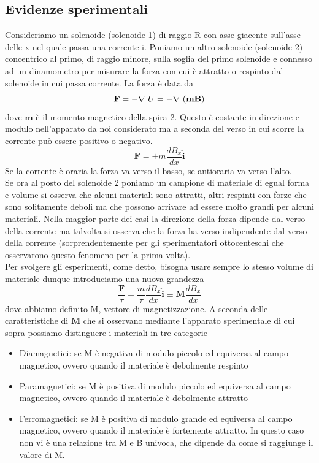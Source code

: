 \documentclass[
10pt, %
a4paper, %
oneside, %
headinclude,footinclude, %
BCOR5mm, %
]{scrartcl}
\begin{document}
\subsection{Evidenze sperimentali}
Consideriamo un solenoide (solenoide 1) di raggio R con asse giacente sull'asse delle x nel quale passa una corrente i. Poniamo un altro solenoide (solenoide 2) concentrico al primo, di raggio minore, sulla soglia del primo solenoide e connesso ad un dinamometro per misurare la forza con cui è attratto o respinto dal solenoide in cui passa corrente. La forza è data da 
\[\mathbf{F} = -\nabla\  U = -\nabla\ (\mathbf{m}\mathbf{B})\]
dove \(\mathbf{m}\) è il momento magnetico della spira 2. Questo è costante in direzione e modulo nell'apparato da noi considerato ma a seconda del verso in cui scorre la corrente può essere positivo o negativo.
\[\mathbf{F}=\pm m \frac{d B_x}{dx}\mathbf{\hat{i}}\]
Se la corrente è oraria la forza va verso il basso, se antioraria va verso l'alto.\\
Se ora al posto del solenoide 2 poniamo un campione di materiale di egual forma e volume si osserva che alcuni materiali sono attratti, altri respinti con forze che sono solitamente deboli ma che possono arrivare ad essere molto grandi per alcuni materiali. Nella maggior parte dei casi la direzione della forza dipende dal verso della corrente ma talvolta si osserva che la forza ha verso indipendente dal verso della corrente (sorprendentemente per gli sperimentatori ottocenteschi che osservarono questo fenomeno per la prima volta).\\
Per svolgere gli esperimenti, come detto, bisogna usare sempre lo stesso volume di materiale dunque introduciamo una nuova grandezza
\[\frac{\mathbf{F}}{\tau} = \frac{m}{\tau}\frac{d B_x}{dx}\mathbf{\hat{i}}\equiv \mathbf{M}\frac{dB_x}{dx}\]
dove abbiamo definito M, vettore di magnetizzazione. A seconda delle caratteristiche di \(\mathbf{M}\) che si osservano mediante l'apparato sperimentale di cui sopra possiamo distinguere i materiali in tre categorie
\begin{itemize}
	\item Diamagnetici: se M è negativa di modulo piccolo ed equiversa al campo magnetico, ovvero quando il materiale è debolmente respinto
	\item Paramagnetici: se M è positiva di modulo piccolo ed equiversa al campo magnetico, ovvero quando il materiale è debolmente attratto
	\item Ferromagnetici: se M è positiva di modulo grande ed equiversa al campo magnetico, ovvero quando il materiale è fortemente attratto. In questo caso non vi è una relazione tra M e B univoca, che dipende da come si raggiunge il valore di M. 
\end{itemize}
\end{document}
